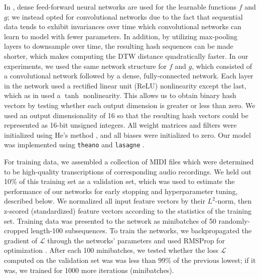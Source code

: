 \documentclass{article} %
\begin{document}
In \cite{masci2014multimodal}, dense feed-forward neural networks are used for the learnable functions $f$ and $g$; we instead opted for convolutional networks due to the fact that sequential data tends to exhibit invariances over time which convolutional networks can learn to model with fewer parameters.
In addition, by utilizing max-pooling layers to downsample over time, the resulting hash sequences can be made shorter, which makes computing the DTW distance quadratically faster.
In our experiments, we used the same network structure for $f$ and $g$, which consisted of a convolutional network followed by a dense, fully-connected network.
Each layer in the network used a rectified linear unit (ReLU) nonlinearity except the last, which as in \cite{masci2014multimodal} used a $\tanh$ nonlinearity.
This allows us to obtain binary hash vectors by testing whether each output dimension is greater or less than zero.
We used an output dimensionality of 16 so that the resulting hash vectors could be represented as 16-bit unsigned integers.
All weight matrices and filters were initialized using He's method \cite{he2015delving}, and all biases were initialized to zero.
Our model was implemented using \texttt{theano} \cite{bastien2012theano,bergstra2010theano} and \texttt{lasagne} \cite{dieleman2015lasagne}.

For training data, we assembled a collection of MIDI files which were determined to be high-quality transcriptions of corresponding audio recordings.
We held out 10\% of this training set as a validation set, which was used to estimate the performance of our networks for early stopping and hyperparameter tuning, described below.
We normalized all input feature vectors by their $L^2$-norm, then z-scored (standardized) feature vectors according to the statistics of the training set.
Training data was presented to the network as minibatches of 50 randomly-cropped length-100 subsequences.
To train the networks, we backpropagated the gradient of $\mathcal{L}$ through the networks' parameters and used RMSProp for optimization \cite{tieleman2012lecture}.
After each 100 minibatches, we tested whether the loss $\mathcal{L}$ computed on the validation set was was less than $99\%$ of the previous lowest; if it was, we trained for 1000 more iterations (minibatches).
\end{document}
